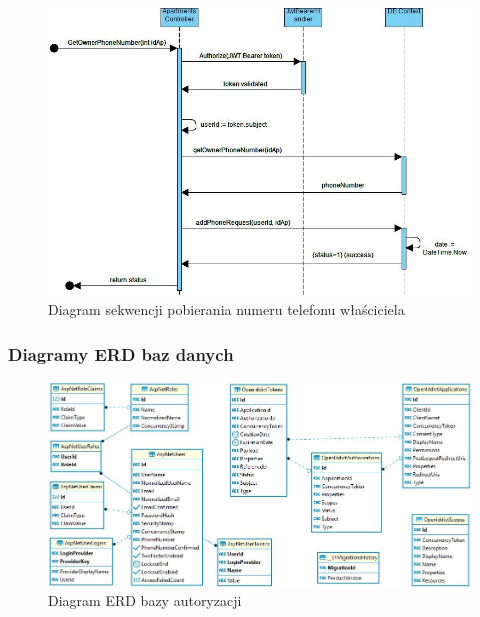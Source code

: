 \documentclass[polish, 11pt]{article}
\begin{document}
            \begin{figure}[H]
                \centering
                \includegraphics[width=\textwidth]{figures/getPhoneSeq.jpg}
                \caption{Diagram sekwencji pobierania numeru telefonu właściciela}
            \end{figure}
        
        \subsubsection{Diagramy ERD baz danych}
            \begin{figure}[H]
                \centering
                \includegraphics[width=\textwidth]{figures/AuthERD.jpg}
                \caption{Diagram ERD bazy autoryzacji}
            \end{figure}
        
\end{document}
